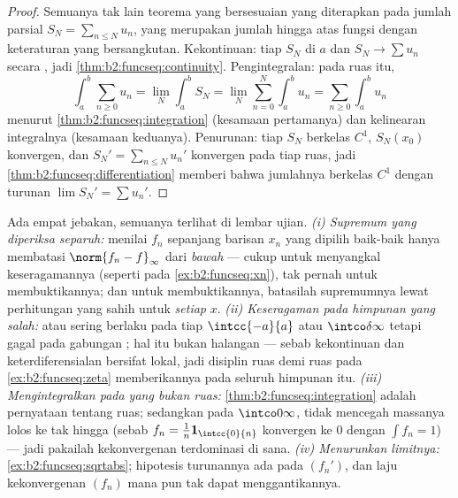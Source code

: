 \begin{proof}
Semuanya tak lain teorema yang bersesuaian yang diterapkan pada jumlah
parsial $S_N = \sum_{n\leq N}u_n$, yang merupakan jumlah hingga atas
fungsi dengan keteraturan yang bersangkutan. Kekontinuan: tiap $S_N$
 di $a$ dan $S_N \to \sum u_n$ secara , jadi
\cref{thm:b2:funcseq:continuity}. Pengintegralan: pada ruas itu,
\[
\int_a^b \sum_{n\geq0} u_n
= \lim_N \int_a^b S_N
= \lim_N \sum_{n=0}^{N}\int_a^b u_n
= \sum_{n\geq0}\int_a^b u_n
\]
menurut \cref{thm:b2:funcseq:integration} (kesamaan pertamanya) dan
kelinearan integralnya (kesamaan keduanya). Penurunan: tiap
$S_N$ berkelas $C^1$, $S_N(x_0)$ konvergen, dan $S_N' =
\sum_{n\leq N}u_n'$ konvergen  pada tiap ruas, jadi
\cref{thm:b2:funcseq:differentiation} memberi bahwa jumlahnya berkelas
$C^1$ dengan turunan $\lim S_N' = \sum u_n'$.
\end{proof}

\begin{remark}
Ada empat jebakan, semuanya terlihat di lembar ujian. \emph{(i)
Supremum yang diperiksa separuh:} menilai $f_n$ sepanjang barisan
$x_n$ yang dipilih baik-baik hanya membatasi $\norm{f_n - f}_\infty$
dari \emph{bawah} --- cukup untuk menyangkal keseragamannya (seperti pada
\cref{ex:b2:funcseq:xn}), tak pernah untuk membuktikannya; dan untuk
membuktikannya, batasilah supremumnya lewat perhitungan yang sahih untuk
\emph{setiap} $x$. \emph{(ii) Keseragaman pada himpunan yang salah:}
 atau  sering berlaku pada tiap
$\intcc{-a}{a}$ atau $\intco\delta\infty$ tetapi gagal pada gabungan
; hal itu bukan halangan --- sebab kekontinuan dan
keterdiferensialan bersifat lokal, jadi disiplin ruas demi ruas pada
\cref{ex:b2:funcseq:zeta} memberikannya pada seluruh himpunan 
itu. \emph{(iii) Mengintegralkan pada yang bukan ruas:}
\cref{thm:b2:funcseq:integration} adalah pernyataan tentang
ruas; sedangkan pada $\intco0\infty$,  tidak
mencegah massanya lolos ke tak hingga (sebab $f_n =
\frac1n\mathbf 1_{\intcc{0}{n}}$ konvergen  ke $0$
dengan $\int f_n = 1$) --- jadi pakailah kekonvergenan terdominasi di
sana. \emph{(iv) Menurunkan limitnya:}
\cref{ex:b2:funcseq:sqrtabs}; hipotesis turunannya ada pada
$(f_n')$, dan laju kekonvergenan $(f_n)$ mana pun tak dapat
menggantikannya.
\end{remark}

